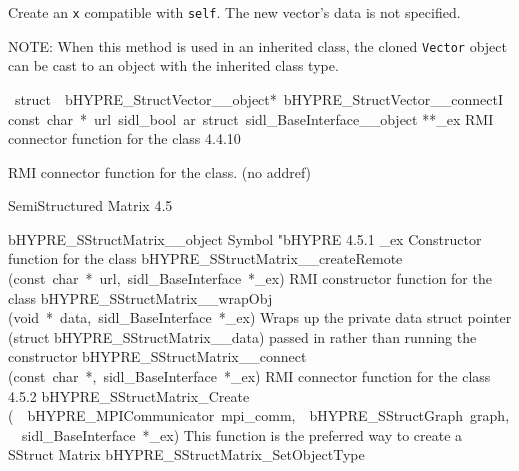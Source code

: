 \documentclass{article}
\begin{document}
\begin{cxxentry}
\begin{cxxentry}
\begin{cxxfunction}
\begin{cxxdoc}
Create an {\tt x} compatible with {\tt self}.
The new vector's data is not specified.

NOTE: When this method is used in an inherited class, the
cloned {\tt Vector} object can be cast to an object with the
inherited class type.
\end{cxxdoc}
\end{cxxfunction}
\begin{cxxvariable}
{\ struct\ \ bHYPRE\_StructVector\_\_object*\ bHYPRE\_StructVector\_\_connectI\ const\ char\ *\ url\ sidl\_bool\ ar\ struct\ sidl\_BaseInterface\_\_object}
        {**\_ex}
        {}
        {
RMI connector function for the class}
        {4.4.10}
\begin{cxxdoc}

RMI connector function for the class. (no addref)
\end{cxxdoc}
\end{cxxvariable}
\end{cxxentry}
\begin{cxxentry}
{}
        {SemiStructured Matrix}
        {}
        {
}
        {4.5}
\begin{cxxnames}
        {bHYPRE\_SStructMatrix\_\_object}
        {}
        {
Symbol "bHYPRE}
        {4.5.1}
        {\_ex}
        {}
        {
Constructor function for the class}
        {}
\label{cxx.4.5.15}
        {bHYPRE\_SStructMatrix\_\_createRemote}
        {(const\ char\ *\ url,\ sidl\_BaseInterface\ *\_ex)}
        {
RMI constructor function for the class}
        {}
\label{cxx.4.5.16}
        {bHYPRE\_SStructMatrix\_\_wrapObj}
        {(void\ *\ data,\ sidl\_BaseInterface\ *\_ex)}
        {
Wraps up the private data struct pointer (struct bHYPRE\_SStructMatrix\_\_data) passed in rather than running the constructor}
        {}
\label{cxx.4.5.17}
        {bHYPRE\_SStructMatrix\_\_connect}
        {(const\ char\ *,\ sidl\_BaseInterface\ *\_ex)}
        {
RMI connector function for the class}
        {4.5.2}
        {bHYPRE\_SStructMatrix\_Create}
        {(\ \ bHYPRE\_MPICommunicator\ mpi\_comm,\ \ bHYPRE\_SStructGraph\ graph,\ \ sidl\_BaseInterface\ *\_ex)}
        {
This function is the preferred way to create a SStruct Matrix}
        {}
\label{cxx.4.5.18}
        {bHYPRE\_SStructMatrix\_SetObjectType}

\end{cxxnames}
\end{cxxentry}
\end{cxxentry}
\end{document}
